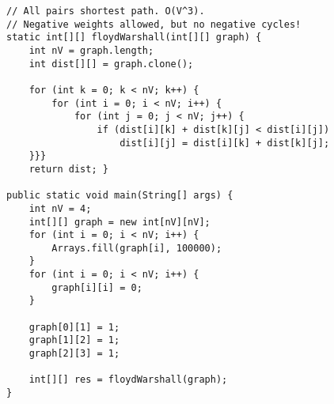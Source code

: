 \begin{verbatim}
// All pairs shortest path. O(V^3).
// Negative weights allowed, but no negative cycles!
static int[][] floydWarshall(int[][] graph) {
	int nV = graph.length;
	int dist[][] = graph.clone();

	for (int k = 0; k < nV; k++) {
		for (int i = 0; i < nV; i++) { 
			for (int j = 0; j < nV; j++) { 
				if (dist[i][k] + dist[k][j] < dist[i][j]) 
					dist[i][j] = dist[i][k] + dist[k][j];
	}}}
	return dist; }

public static void main(String[] args) {
	int nV = 4;
	int[][] graph = new int[nV][nV];
	for (int i = 0; i < nV; i++) {
		Arrays.fill(graph[i], 100000);
	}
	for (int i = 0; i < nV; i++) {
		graph[i][i] = 0;
	}

	graph[0][1] = 1;
	graph[1][2] = 1;
	graph[2][3] = 1;

	int[][] res = floydWarshall(graph);
}
\end{verbatim}